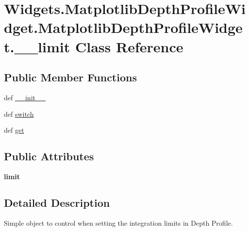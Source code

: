 \hypertarget{classWidgets_1_1MatplotlibDepthProfileWidget_1_1MatplotlibDepthProfileWidget_1_1____limit}{\section{Widgets.\-Matplotlib\-Depth\-Profile\-Widget.\-Matplotlib\-Depth\-Profile\-Widget.\-\_\-\-\_\-limit Class Reference}
\label{classWidgets_1_1MatplotlibDepthProfileWidget_1_1MatplotlibDepthProfileWidget_1_1____limit}
}
\subsection*{Public Member Functions}
\begin{DoxyCompactItemize}
\item 
def \hyperlink{classWidgets_1_1MatplotlibDepthProfileWidget_1_1MatplotlibDepthProfileWidget_1_1____limit_a193463a83f72bee9ec80e3a309f22395}{\-\_\-\-\_\-init\-\_\-\-\_\-}
\item 
def \hyperlink{classWidgets_1_1MatplotlibDepthProfileWidget_1_1MatplotlibDepthProfileWidget_1_1____limit_adb06df8be28f77e5dd27ca3164a5f180}{switch}
\item 
def \hyperlink{classWidgets_1_1MatplotlibDepthProfileWidget_1_1MatplotlibDepthProfileWidget_1_1____limit_a166e191f900a9ae7c20afed9747583ef}{get}
\end{DoxyCompactItemize}
\subsection*{Public Attributes}
\begin{DoxyCompactItemize}
\item 
\hypertarget{classWidgets_1_1MatplotlibDepthProfileWidget_1_1MatplotlibDepthProfileWidget_1_1____limit_a07e589b00acef1dcede977eae8007c86}{{\bfseries limit}}\label{classWidgets_1_1MatplotlibDepthProfileWidget_1_1MatplotlibDepthProfileWidget_1_1____limit_a07e589b00acef1dcede977eae8007c86}

\end{DoxyCompactItemize}


\subsection{Detailed Description}
\begin{DoxyVerb}Simple object to control when setting the integration 
limits in Depth Profile.
\end{DoxyVerb}
 

